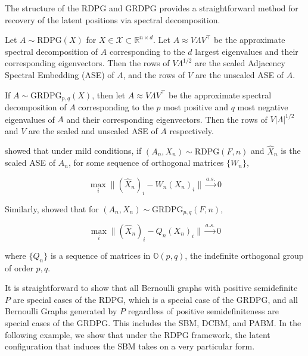 \documentclass[
  11pt,
]{article}
\begin{document}
The structure of the RDPG and GRDPG provides a straightforward method
for recovery of the latent positions via spectral decomposition.

\begin{definition}
Let $A \sim \text{RDPG}(X)$ for $X \in \mathcal{X} \subset \mathbb{R}^{n \times d}$. Let $A \approx V \Lambda V^\top$ be the approximate spectral decomposition of $A$ corresponding to the $d$ largest eigenvalues and their corresponding eigenvectors. Then the rows of $V \Lambda^{1/2}$ are the scaled Adjacency Spectral Embedding (ASE) of $A$, and the rows of $V$ are the unscaled ASE of $A$. 

If $A \sim \text{GRDPG}_{p, q}(X)$, then let $A \approx V \Lambda V^\top$ be the approximate spectral decomposition of $A$ corresponding to the $p$ most positive and $q$ most negative eigenvalues of $A$ and their corresponding eigenvectors. Then the rows of $V |\Lambda|^{1/2}$ and $V$ are the scaled and unscaled ASE of $A$ respectively.
\end{definition}

\citet{athreya2017statistical} showed that under mild conditions, if
\((A_n, X_n) \sim \text{RDPG}(F, n)\) and \(\hat{X}_n\) is the scaled
ASE of \(A_n\), for some sequence of orthogonal matrices \(\{W_n\}\),

\begin{equation}
\max_i \|(\hat{X}_n)_i - W_n (X_n)_i \| \stackrel{a.s.}{\to} 0
\end{equation}

Similarly, \citet{rubindelanchy2017statistical} showed that for
\((A_n, X_n) \sim \text{GRDPG}_{p, q}(F, n)\),

\begin{equation}
\max_i \|(\hat{X}_n)_i - Q_n (X_n)_i \| \stackrel{a.s.}{\to} 0
\end{equation}

where \(\{Q_n\}\) is a sequence of matrices in \(\mathbb{O}(p, q)\), the
indefinite orthogonal group of order \(p, q\).

It is straightforward to show that all Bernoulli graphs with positive
semidefinite \(P\) are special cases of the RDPG, which is a special
case of the GRDPG, and all Bernoulli Graphs generated by \(P\)
regardless of positive semidefiniteness are special cases of the GRDPG.
This includes the SBM, DCBM, and PABM. In the following example, we show
that under the RDPG framework, the latent configuration that induces the
SBM takes on a very particular form.
\end{document}
